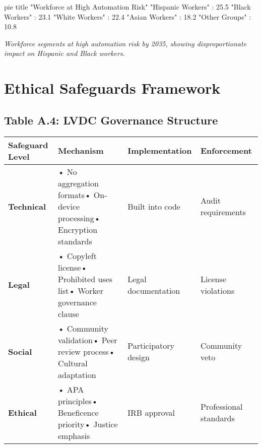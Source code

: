 \documentclass[
  a4paper,
]{report}
\newenvironment{Shaded}{\begin{snugshade}}{\end{snugshade}}
\newcommand{\NormalTok}[1]{\textcolor[rgb]{0.00,0.23,0.31}{#1}}
\begin{document}
\begin{Shaded}
\begin{Highlighting}[]
\NormalTok{pie title "Workforce at High Automation Risk"}
\NormalTok{    "Hispanic Workers" : 25.5}
\NormalTok{    "Black Workers" : 23.1}
\NormalTok{    "White Workers" : 22.4}
\NormalTok{    "Asian Workers" : 18.2}
\NormalTok{    "Other Groups" : 10.8}
\end{Highlighting}
\end{Shaded}

\emph{Workforce segments at high automation risk by 2035, showing
disproportionate impact on Hispanic and Black workers.}

\section{Ethical Safeguards
Framework}\label{ethical-safeguards-framework}

\subsection{Table A.4: LVDC Governance
Structure}\label{table-a.4-lvdc-governance-structure}

\begin{landscape}

\begin{longtable}[]{@{}
  >{\raggedright\arraybackslash}p{}
  >{\raggedright\arraybackslash}p{}
  >{\raggedright\arraybackslash}p{}
  >{\raggedright\arraybackslash}p{}@{}}
\toprule\noalign{}
\begin{minipage}[b]{\linewidth}\raggedright
Safeguard Level
\end{minipage} & \begin{minipage}[b]{\linewidth}\raggedright
Mechanism
\end{minipage} & \begin{minipage}[b]{\linewidth}\raggedright
Implementation
\end{minipage} & \begin{minipage}[b]{\linewidth}\raggedright
Enforcement
\end{minipage} \\
\midrule\noalign{}
\endhead
\bottomrule\noalign{}
\endlastfoot
\textbf{Technical} & • No aggregation formats• On-device processing•
Encryption standards & Built into code & Audit requirements \\
\textbf{Legal} & • Copyleft license• Prohibited uses list• Worker
governance clause & Legal documentation & License violations \\
\textbf{Social} & • Community validation• Peer review process• Cultural
adaptation & Participatory design & Community veto \\
\textbf{Ethical} & • APA principles• Beneficence priority• Justice
emphasis & IRB approval & Professional standards \\
\end{longtable}

\end{landscape}
\end{document}
